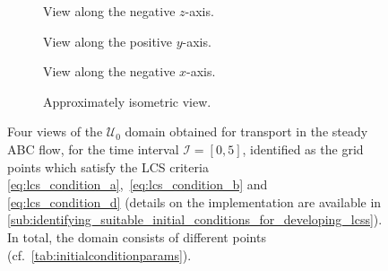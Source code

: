 \begin{figure}[htpb]
    \centering
    \hspace*{\fill}
    \begin{subfigure}[b]{0.43\textwidth}
        \centering
        \caption[]{{\small View along the negative $z$-axis.}}
        \label{fig:steady_abd_z}
    \end{subfigure}\hfill%
    \begin{subfigure}[b]{0.43\textwidth}
        \centering
        \caption[]{{\small View along the positive $y$-axis.}}
        \label{fig:steady_abd_y}
    \end{subfigure}%
    \hspace*{\fill}

    \hspace*{\fill}
    \begin{subfigure}[b]{0.43\textwidth}
        \centering
        \caption[]{{\small View along the negative $x$-axis.}}
        \label{fig:steady_abd_x}
    \end{subfigure}\hfill%
    \begin{subfigure}[b]{0.43\textwidth}
        \centering
        \caption[]{{\small Approximately isometric view.}}
        \label{fig:steady_abd_isometric}
    \end{subfigure}%
    \hspace*{\fill}
    \caption[Four views of the $\mathcal{U}_{0}$ domain obtained for transport
    in the steady ABC flow]
    {
        Four views of the $\mathcal{U}_{0}$ domain obtained for transport in the
        steady ABC flow, for the time interval $\mathcal{I}=[0,5]$, identified
        as the grid points which satisfy the LCS criteria
        \eqref{eq:lcs_condition_a},~\eqref{eq:lcs_condition_b} and~
        \eqref{eq:lcs_condition_d} (details on the implementation are available
        in
        \cref{sub:identifying_suitable_initial_conditions_for_developing_lcss}).
        In total, the domain consists of  different points
        (cf.\ \cref{tab:initialconditionparams}).
}
    \label{fig:steady_abd}
\end{figure}


